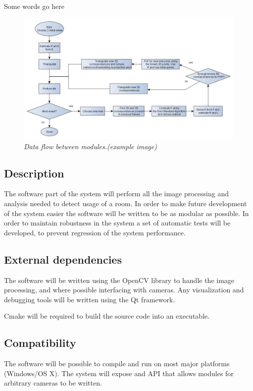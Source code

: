 Some words go here

\begin{figure}[htb]
	\centering
	\includegraphics[width=160mm]{images/example1.jpg}
	\caption[This text ends up at the list of figures]{\textit{Data flow between modules.(example image)}}
	\label{fig:block_overview_fig}  %
\end{figure}


\subsection{Description}
The software part of the system will perform all the image processing and analysis needed to detect usage of a room. In order to make future development of the system easier the software will be written to be as modular as possible. In order to maintain robustness in the system a set of automatic tests will be developed, to prevent regression of the system performance.
 
\subsection{External dependencies}
The software will be written using the OpenCV library to handle the image processing, and where possible interfacing with cameras. Any visualization and debugging tools will be written using the Qt framework.

Cmake will be required to build the source code into an executable.

\subsection{Compatibility}
The software will be possible to compile and run on most major platforms (Windows/OS X). The system will expose and API that allows modules for arbitrary cameras to be written.

